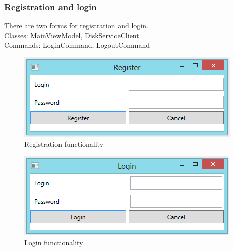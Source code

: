 \documentclass[JCDReport.tex]{subfiles}
\begin{document}
\subsubsection{Registration and login}
There are two forms for registration and login.\\
Classes: MainViewModel, DiskServiceClient\\
Commands: LoginCommand, LogoutCommand
\begin{figure}[h!]
	\centering
	\includegraphics[scale=1]{imageslukas/registration.png}
	\caption{Registration functionality}
\end{figure}	
\begin{figure}[h!]
	\centering
	\includegraphics[scale=1]{imageslukas/login.png} 
	\caption{Login functionality}
\end{figure}	
	
\end{document}
